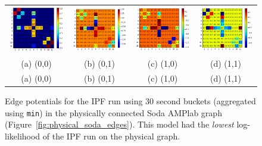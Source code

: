 \begin{figure}
\centering
\begin{tabular}{cccc}
\includegraphics[width=1.3in]{figs/30secmin00conf} & \includegraphics[width=1.3in]{figs/30secmin01conf} & \includegraphics[width=1.3in]{figs/30secmin10conf} & \includegraphics[width=1.3in]{figs/30secmin11conf} \\
(a) (0,0) & (b) (0,1) & (c) (1,0) & (d) (1,1) \\[6pt]
(a) (0,0) & (b) (0,1) & (c) (1,0) & (d) (1,1) \\[6pt]
\end{tabular}
\caption{Edge potentials for the IPF run using 30 second buckets (aggregated using \texttt{min}) in the physically connected Soda AMPlab graph (Figure~\ref{fig:physical_soda_edges}). This model had the \emph{lowest} log-likelihood of the IPF run on the physical graph.}
\label{fig:30secminphysical}
\end{figure}

